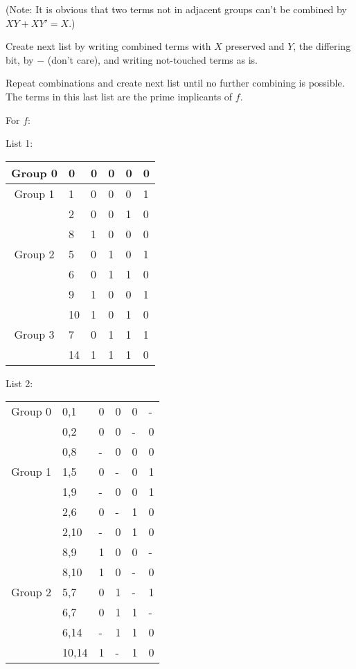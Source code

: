 \documentclass[a4paper,12pt]{article}
\begin{document}
\begin{itemize}
\begin{itemize}
\begin{itemize}
\begin{itemize}
\begin{itemize}
\begin{itemize}
\begin{itemize}
(Note: It is obvious that two terms not in adjacent groups can't be combined by $XY+XY'=X$.)

Create next list by writing combined terms with $X$ preserved and $Y$, the differing bit, by $-$ (don't care), and writing not-touched terms as is.

Repeat combinations and create next list until no further combining is possible. The terms in this last list are the prime implicants of $f$.

For $f$:

List 1:
\begin{longtable}[c]{|c|m|mmmm|}
\hline
Group 0 & 0 & 0 & 0 & 0 & 0 \\\hline
Group 1 & 1 & 0 & 0 & 0 & 1 \\\cline{2-6}
& 2 & 0 & 0 & 1 & 0 \\\cline{2-6}
& 8 & 1 & 0 & 0 & 0 \\\hline
Group 2 & 5 & 0 & 1 & 0 & 1 \\\cline{2-6}
& 6 & 0 & 1 & 1 & 0 \\\cline{2-6}
& 9 & 1 & 0 & 0 & 1 \\\cline{2-6}
& 10 & 1 & 0 & 1 & 0 \\\hline
Group 3 & 7 & 0 & 1 & 1 & 1 \\\cline{2-6}
& 14 & 1 & 1 & 1 & 0 \\\hline
\end{longtable}

List 2:
\begin{longtable}[c]{|c|m|mmmm|}
\hline
Group 0 & 0,1 & 0 & 0 & 0 & - \\\cline{2-6}
& 0,2 & 0 & 0 & - & 0 \\\cline{2-6}
& 0,8 & - & 0 & 0 & 0 \\\hline
Group 1 & 1,5 & 0 & - & 0 & 1 \\\cline{2-6}
& 1,9 & - & 0 & 0 & 1 \\\cline{2-6}
& 2,6 & 0 & - & 1 & 0 \\\cline{2-6}
& 2,10 & - & 0 & 1 & 0 \\\cline{2-6}
& 8,9 & 1 & 0 & 0 & - \\\cline{2-6}
& 8,10 & 1 & 0 & - & 0 \\\hline
Group 2 & 5,7 & 0 & 1 & - & 1 \\\cline{2-6}
& 6,7 & 0 & 1 & 1 & - \\\cline{2-6}
& 6,14 & - & 1 & 1 & 0 \\\cline{2-6}
& 10,14 & 1 & - & 1 & 0 \\\hline
\end{longtable}


\end{itemize}
\end{itemize}
\end{itemize}
\end{itemize}
\end{itemize}
\end{itemize}
\end{itemize}
\end{document}

